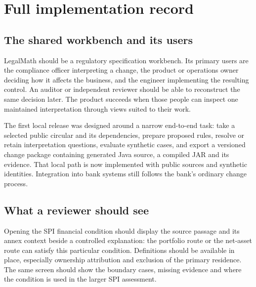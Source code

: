\chapter{Full implementation record}
\label{app:full-implementation-record}


\section{The shared workbench and its users}
\label{merge:P-03-product:00}

\label{sec:product}

LegalMath should be a regulatory specification workbench. Its primary users are
the compliance officer interpreting a change, the product or operations owner
deciding how it affects the business, and the engineer implementing the resulting
control. An auditor or independent reviewer should be able to reconstruct the
same decision later. The product succeeds when those people can inspect one
maintained interpretation through views suited to their work.

The first local release was designed around a narrow end-to-end task: take a selected public
circular and its dependencies, prepare proposed rules, resolve or retain
interpretation questions, evaluate synthetic cases, and export a versioned change
package containing generated Java source, a compiled JAR and its evidence.
That local path is now implemented with public sources and synthetic
identities. Integration into bank systems still follows the bank's ordinary
change process.


\section{What a reviewer should see}
\label{merge:P-03-product:01}


Opening the SPI financial condition should display the source passage and its
annex context beside a controlled explanation: the portfolio route or the
net-asset route can satisfy this particular condition. Definitions should be
available in place, especially ownership attribution and exclusion of the primary
residence. The same screen should show the boundary cases, missing evidence and
where the condition is used in the larger SPI assessment.

